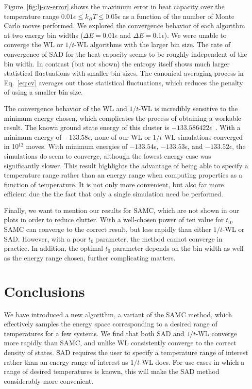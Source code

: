 \documentclass[letterpaper,twocolumn,amsmath,amssymb,pre,aps,10pt]{revtex4-1}
\begin{document}
Figure~\ref{fig:lj-cv-error} shows the maximum error in heat capacity
over the temperature range $0.01\epsilon\le k_BT\le 0.05\epsilon$ as a
function of the number of Monte Carlo moves performed.
%
We explored the convergence behavior of each algorithm at two energy
bin widths ($\Delta E=0.01\epsilon$ and $\Delta E=0.1\epsilon$).  We
were unable to converge the WL or $1/t$-WL algorithms with the larger
bin size.
%
The rate of convergence of SAD for the heat capacity seems to be roughly
independent of the bin width.  In contrast (but not shown) the entropy
itself shows much larger statistical fluctuations with smaller bin
sizes.  The canonical averaging process in Eq.~\ref{eq:cv} averages
out those statistical fluctuations, which reduces the penalty of using
a smaller bin size.

The convergence behavior of the WL and $1/t$-WL is incredibly
sensitive to the minimum energy chosen, which complicates the process of
obtaining a workable result.  The known ground state energy of this
cluster is $-133.586422\epsilon$~\cite{northby1987structure,
  wales1997global}.  With a minimum energy of $-133.58\epsilon$, none
of our WL or $1/t$-WL simulations converged in 10$^{12}$ moves.  With minimum
energies of $-133.54\epsilon$, $-133.53\epsilon$, and
$-133.52\epsilon$, the simulations do seem to converge, although the
lowest energy case was significantly slower.
This result highlights the advantage of being able to
specify a temperature range rather than an energy range when computing
properties as a function of temperature.  It is not only more
convenient, but also far more efficient due the the fact that only a
single simulation need be performed.

Finally, we want to mention our results for SAMC, which are not shown
in our plots in order to reduce clutter.  With a well-chosen power of ten value for
$t_0$, SAMC can converge to the correct result, but less rapidly than
either $1/t$-WL or SAD.  However, with a poor $t_0$
parameter, the method cannot converge in practice.  In addition, the
optimal $t_0$ parameter depends on the bin width as well as the energy
range chosen, further complicating matters.

\section{Conclusions}
We have introduced a new algorithm, a variant of the SAMC method, which
effectively samples the
energy space corresponding to a desired range of temperatures for a
few systems.
%
We find that both SAD and $1/t$-WL converge more rapidly than SAMC, and
unlike WL consistently converge to the correct density of states. SAD requires
the user to specify a temperature range of interest rather than an
energy range of interest as $1/t$-WL does.  For use cases in which
a range of desired temperatures is known, this will make the SAD method
considerably more convenient.
\end{document}
